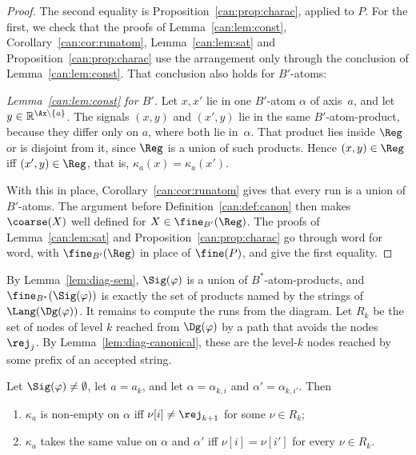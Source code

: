 \begin{proof}
The second equality is Proposition~\ref{can:prop:charac}, applied to $P$. For the
first, we check that the proofs of Lemma~\ref{can:lem:const},
Corollary~\ref{can:cor:runatom}, Lemma~\ref{can:lem:sat} and
Proposition~\ref{can:prop:charac} use the arrangement only through the conclusion
of Lemma~\ref{can:lem:const}. That conclusion also holds for $B'$-atoms:

\emph{Lemma~\ref{can:lem:const} for $B'$.} Let $x,x'$ lie in one $B'$-atom $\alpha$
of axis~$a$, and let $y\in\mathbb{R}^{\Ax\setminus\{a\}}$. The signals $(x,y)$
and $(x',y)$ lie in the same $B'$-atom-product, because they differ only on
$a$, where both lie in~$\alpha$. That product lies inside $\Reg$ or is disjoint
from it, since $\Reg$ is a union of such products. Hence $(x,y)\in\Reg$ iff
$(x',y)\in\Reg$, that is, $\kappa_a(x)=\kappa_a(x')$.

With this in place, Corollary~\ref{can:cor:runatom} gives that every run is a union
of $B'$-atoms. The argument before Definition~\ref{can:def:canon} then makes
$\coarse(X)$ well defined for $X\in\fine_{B'}(\Reg)$. The proofs of
Lemma~\ref{can:lem:sat} and Proposition~\ref{can:prop:charac} go through word for word,
with $\fine_{B'}(\Reg)$ in place of $\fine(P)$, and give the first equality.
\end{proof}

By Lemma~\ref{lem:diag-sem}, $\Sig(\varphi)$ is a union of
$B^*$-atom-products, and $\fine_{B^*}(\Sig(\varphi))$ is exactly the set of
products named by the strings of $\Lang(\Dg(\varphi))$. It remains to compute
the runs from the diagram. Let $R_k$ be the set of nodes of level $k$ reached
from $\Dg(\varphi)$ by a path that avoids the nodes $\rej_j$. By
Lemma~\ref{lem:diag-canonical}, these are the level-$k$ nodes reached by some
prefix of an accepted string.

\begin{lemma}\label{lem:fibre}
Let $\Sig(\varphi)\neq\emptyset$, let $a=a_k$, and let $\alpha=\alpha_{k,i}$
and $\alpha'=\alpha_{k,i'}$. Then
\begin{enumerate}
  \item $\kappa_a$ is non-empty on $\alpha$ iff $\nu[i]\neq\rej_{k+1}$ for some
    $\nu\in R_k$;
  \item $\kappa_a$ takes the same value on $\alpha$ and $\alpha'$ iff
    $\nu[i]=\nu[i']$ for every $\nu\in R_k$.
\end{enumerate}
\end{lemma}

